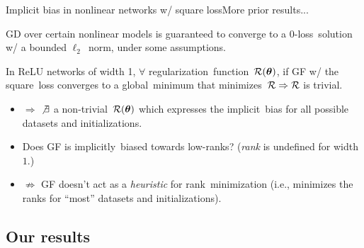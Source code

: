 \documentclass[handout,usenames,dvipsnames]{beamer} %
\newcommand{\btheta}{{\boldsymbol{\theta}}}
\newcommand{\calr}{{\cal R}}
\begin{document}
\begin{frame}{Implicit bias in nonlinear networks w/ square loss}{More prior results...}
    \pause
    \begin{block}{\cite{oymak2019overparameterized}}
         GD over certain nonlinear models is guaranteed to converge to a 0-loss~solution w/ a bounded $\ell_2$~norm, under some assumptions.
    \end{block}
    \pause
    \begin{block}{\cite{vardi2021implicit}}
         In ReLU networks of width 1, $\forall$ regularization~function~$\calr(\btheta)$, if  GF w/ the square~loss converges to a global~minimum that minimizes~$\calr \Rightarrow \calr$ is \alert{trivial}. %
    \end{block}
    \pause
    \begin{itemize}
        \item $\Rightarrow$ $\not\exists$ a non-trivial~$\calr(\btheta)$ which expresses the implicit~bias for all possible datasets and initializations.
        \pause
        \item Does GF is implicitly~biased towards low-ranks? (\emph{rank} is undefined for width $1$.)
        \pause
        \item $\not\Rightarrow$ GF doesn't act as a \emph{heuristic} for rank~minimization (i.e., minimizes the ranks for ``most'' datasets and initializations).
    \end{itemize}
    
\end{frame}




\subsection{Our results}
\end{document}
